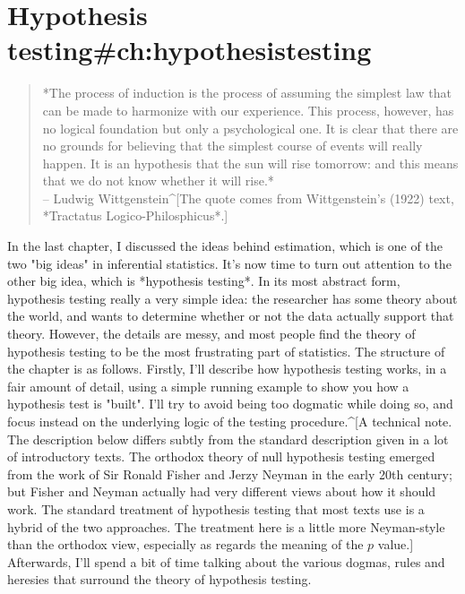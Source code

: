 
\chapter{Hypothesis testing{#ch:hypothesistesting}}

\begin{quote}
*The process of induction is the process of assuming the simplest law that can be made to harmonize with our experience. This process, however, has no logical foundation but only a psychological one. It is clear that there are no grounds for believing that the simplest course of events will really happen. It is an hypothesis that the sun will rise tomorrow: and this means that we do not know whether it will rise.* \\ \hspace*{2cm} -- Ludwig Wittgenstein^[The quote comes from Wittgenstein's (1922) text, *Tractatus Logico-Philosphicus*.]
\end{quote}
\vspace*{12pt}


In the last chapter, I discussed the ideas behind estimation, which is one of the two "big ideas" in inferential statistics. It's now time to turn out attention to the other big idea, which is *hypothesis testing*. In its most abstract form, hypothesis testing really a very simple idea: the researcher has some theory about the world, and wants to determine whether or not the data actually support that theory. However, the details are messy, and most people find the theory of hypothesis testing to be the most frustrating part of statistics. The structure of the chapter is as follows. Firstly, I'll describe how hypothesis testing works, in a fair amount of detail, using a simple running example to show you how a hypothesis test is "built". I'll try to avoid being too dogmatic while doing so, and focus instead on the underlying logic of the testing procedure.^[A technical note. The description below differs subtly from the standard description given in a lot of introductory texts. The orthodox theory of null hypothesis testing emerged from the work of Sir Ronald Fisher and Jerzy Neyman in the early 20th century; but Fisher and Neyman actually had very different views about how it should work. The standard treatment of hypothesis testing that most texts use is a hybrid of the two approaches. The treatment here is a little more Neyman-style than the orthodox view, especially as regards the meaning of the $p$ value.] Afterwards, I'll spend a bit of time talking about the various dogmas, rules and heresies that surround the theory of hypothesis testing. 

